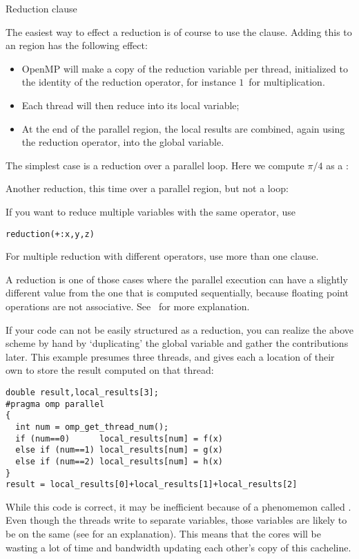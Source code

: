  {Reduction clause}

The easiest way to effect a reduction is of course to use the 
clause.
Adding this to an  region
has the following effect:
\begin{itemize}
\item OpenMP will make a copy of the reduction variable per thread,
  initialized to the identity of the reduction operator, for instance
  $1$~for multiplication.
\item Each thread will then reduce into its local variable;
\item At the end of the parallel region, the local results are combined, again
  using the reduction operator, into the global variable.
\end{itemize}

The simplest case is a reduction over a parallel loop.
Here we compute $\pi/4$ as a :


Another reduction, this time over a parallel region, but not a loop:
%

If you want to reduce multiple variables with the same operator, use
\begin{lstlisting}
reduction(+:x,y,z)
\end{lstlisting}
For multiple reduction with different operators, use more than one clause.

A reduction is one of those cases where the parallel execution can have a slightly different
value from the one that is computed sequentially, because floating point operations
are not associative. See~ for more explanation.

If your code can not be easily structured as a reduction, you can 
realize the above scheme by hand by
`duplicating' the global variable and gather the contributions later.
This example presumes three threads, and gives each a location of their
own to store the result computed on that thread:
\begin{lstlisting}
double result,local_results[3];
#pragma omp parallel
{
  int num = omp_get_thread_num();
  if (num==0)      local_results[num] = f(x)
  else if (num==1) local_results[num] = g(x)
  else if (num==2) local_results[num] = h(x)
}
result = local_results[0]+local_results[1]+local_results[2]
\end{lstlisting}
While this code is correct, it may be inefficient because of a
phenomemon called . Even though the threads write
to separate variables, those variables are likely to be on the same 
 (see  for an explanation).
This means that the cores will be wasting a lot of time and bandwidth updating
each other's copy of this cacheline.

